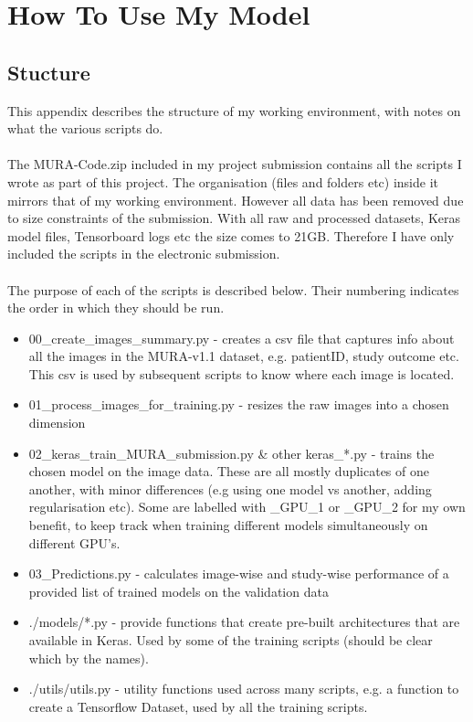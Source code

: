 \documentclass[11pt]{article} %
\theoremstyle{plain}
\theoremstyle{definition}
\begin{document}
\clearpage
\appendix
\section{How To Use My Model}
\subsection{Stucture}
This appendix describes the structure of my working environment, with notes on what the various scripts do. 
\\
\\
\noindent
The MURA-Code.zip included in my project submission contains all the scripts I wrote as part of this project. The organisation (files and folders etc) inside it mirrors that of my working environment. However all data has been removed due to size constraints of the submission. With all raw and processed datasets, Keras model files, Tensorboard logs etc the size comes to 21GB. Therefore I have only included the scripts in the electronic submission. 
\\
\\
\noindent
The purpose of each of the scripts is described below. Their numbering indicates the order in which they should be run.
\begin{itemize}
\item 00\_create\_images\_summary.py - creates a csv file that captures info about all the images in the MURA-v1.1 dataset, e.g. patientID, study outcome etc. This csv is used by subsequent scripts to know where each image is located.
\item 01\_process\_images\_for\_training.py - resizes the raw images into a chosen dimension
\item 02\_keras\_train\_MURA\_submission.py \& other keras\_*.py - trains the chosen model on the image data. These are all mostly duplicates of one another, with minor differences (e.g using one model vs another, adding regularisation etc). Some are labelled with \_GPU\_1 or \_GPU\_2 for my own benefit, to keep track when training different models simultaneously on different GPU's.
\item 03\_Predictions.py - calculates image-wise and study-wise performance of a provided list of trained models on the validation data
\item ./models/*.py  - provide functions that create pre-built architectures that are available in Keras. Used by some of the training scripts (should be clear which by the names).
\item ./utils/utils.py - utility functions used across many scripts, e.g. a function to create a Tensorflow Dataset, used by all the training scripts.
\end{itemize}
\end{document}
